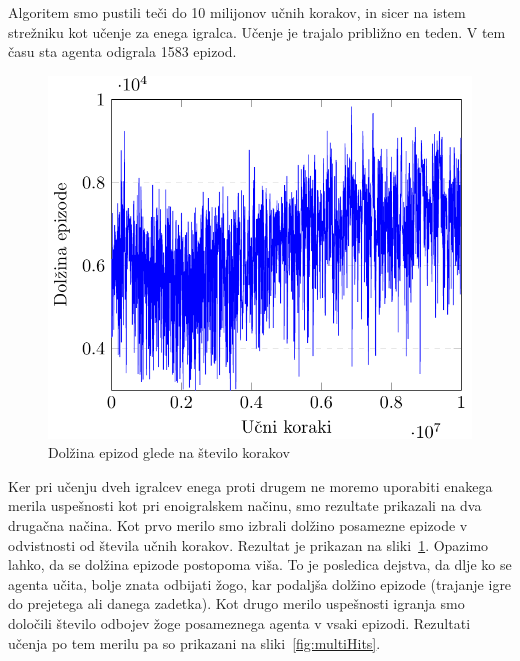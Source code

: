 \documentclass[cover]{thesis}
\begin{document}
Algoritem smo pustili teči do 10 milijonov učnih korakov, in sicer na istem strežniku kot učenje za enega igralca. Učenje je trajalo približno en teden. V tem času sta agenta odigrala 1583 epizod.

\begin{figure}[h]
    \centering
    \includegraphics{fig2.pdf}
    \caption{Dolžina epizod glede na število korakov}\label{fig:multiLength}
\end{figure}

Ker pri učenju dveh igralcev enega proti drugem ne moremo uporabiti enakega merila uspešnosti kot pri enoigralskem načinu, smo rezultate prikazali na dva drugačna načina. Kot prvo merilo smo izbrali dolžino posamezne epizode v odvistnosti od števila učnih korakov. Rezultat je prikazan na sliki~\ref{fig:multiLength}. Opazimo lahko, da se dolžina epizode postopoma viša. To je posledica dejstva, da dlje ko se agenta učita, bolje znata odbijati žogo, kar podaljša dolžino epizode (trajanje igre do prejetega ali danega zadetka). Kot drugo merilo uspešnosti igranja smo določili število odbojev žoge posameznega agenta v vsaki epizodi. Rezultati učenja po tem merilu pa so prikazani na sliki~\ref{fig:multiHits}.
\end{document}
